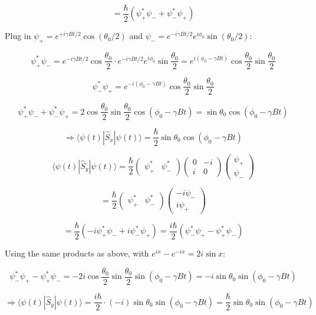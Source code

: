 \documentclass[
]{article}
\providecommand{\Rarr}{\Rightarrow}
\begin{document}
\[
	= \frac{\hbar}{2}\left(\psi_+^*\psi_- + \psi_-^*\psi_+\right)
\]

Plug in \(\psi_+ = e^{+i\gamma B t/2}\cos(\theta_0/2)\) and \(\psi_- = e^{-i\gamma B t/2}e^{i\phi_0}\sin(\theta_0/2)\):

\[
	\psi_+^*\psi_- = e^{-i\gamma B t/2}\cos\frac{\theta_0}{2} \cdot e^{-i\gamma B t/2}e^{i\phi_0}\sin\frac{\theta_0}{2} = e^{i(\phi_0 - \gamma B t)}\cos\frac{\theta_0}{2}\sin\frac{\theta_0}{2}
\]

\[
	\psi_-^*\psi_+ = e^{-i(\phi_0 - \gamma B t)}\cos\frac{\theta_0}{2}\sin\frac{\theta_0}{2}
\]

\[
	\psi_+^*\psi_- + \psi_-^*\psi_+ = 2\cos\frac{\theta_0}{2}\sin\frac{\theta_0}{2}\cos(\phi_0 - \gamma B t) = \sin\theta_0 \cos(\phi_0 - \gamma B t)
\]

\[
	\Rarr \langle\psi(t)|\hat{S}_x|\psi(t)\rangle = \frac{\hbar}{2}\sin\theta_0 \cos(\phi_0 - \gamma B t)
\]

\[
	\langle\psi(t)|\hat{S}_y|\psi(t)\rangle = \frac{\hbar}{2}\begin{pmatrix}\psi_+^* & \psi_-^*\end{pmatrix}\begin{pmatrix}0 & -i \\ i & 0\end{pmatrix}\begin{pmatrix}\psi_+ \\ \psi_-\end{pmatrix}
\]

\[
	= \frac{\hbar}{2}\begin{pmatrix}\psi_+^* & \psi_-^*\end{pmatrix}\begin{pmatrix}-i\psi_- \\ i\psi_+\end{pmatrix}
\]

\[
	= \frac{\hbar}{2}\left(-i\psi_+^*\psi_- + i\psi_-^*\psi_+\right) = \frac{i\hbar}{2}\left(\psi_-^*\psi_+ - \psi_+^*\psi_-\right)
\]

Using the same products as above, with \(e^{ix} - e^{-ix} = 2i\sin x\):

\[
	\psi_-^*\psi_+ - \psi_+^*\psi_- = -2i\cos\frac{\theta_0}{2}\sin\frac{\theta_0}{2}\sin(\phi_0 - \gamma B t) = -i\sin\theta_0\sin(\phi_0 - \gamma B t)
\]

\[
	\Rarr \langle\psi(t)|\hat{S}_y|\psi(t)\rangle = \frac{i\hbar}{2}\cdot(-i)\sin\theta_0\sin(\phi_0 - \gamma B t) = \frac{\hbar}{2}\sin\theta_0\sin(\phi_0 - \gamma B t)
\]
\end{document}
